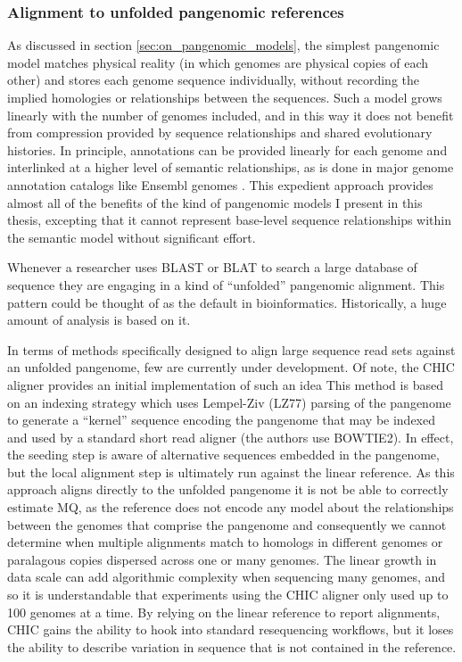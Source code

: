 \subsubsection{Alignment to unfolded pangenomic references}

As discussed in section \ref{sec:on_pangenomic_models}, the simplest pangenomic model matches physical reality (in which genomes are physical copies of each other) and stores each genome sequence individually, without recording the implied homologies or relationships between the sequences.
Such a model grows linearly with the number of genomes included, and in this way it does not benefit from compression provided by sequence relationships and shared evolutionary histories.
In principle, annotations can be provided linearly for each genome and interlinked at a higher level of semantic relationships, as is done in major genome annotation catalogs like Ensembl genomes \cite{kersey2015ensembl}.
This expedient approach provides almost all of the benefits of the kind of pangenomic models I present in this thesis, excepting that it cannot represent base-level sequence relationships within the semantic model without significant effort.

Whenever a researcher uses BLAST or BLAT to search a large database of sequence they are engaging in a kind of ``unfolded'' pangenomic alignment.
This pattern could be thought of as the default in bioinformatics.
Historically, a huge amount of analysis is based on it.

In terms of methods specifically designed to align large sequence read sets against an unfolded pangenome, few are currently under development.
Of note, the CHIC aligner provides an initial implementation of such an idea \cite{valenzuela2017chic}
This method is based on an indexing strategy which uses Lempel-Ziv (LZ77) \cite{ziv1977universal} parsing of the pangenome to generate a ``kernel'' sequence encoding the pangenome that may be indexed and used by a standard short read aligner (the authors use BOWTIE2).
In effect, the seeding step is aware of alternative sequences embedded in the pangenome, but the local alignment step is ultimately run against the linear reference.
As this approach aligns directly to the unfolded pangenome it is not be able to correctly estimate MQ, as the reference does not encode any model about the relationships between the genomes that comprise the pangenome and consequently we cannot determine when multiple alignments match to homologs in different genomes or paralagous copies dispersed across one or many genomes.
The linear growth in data scale can add algorithmic complexity when sequencing many genomes, and so it is understandable that experiments using the CHIC aligner only used up to 100 genomes at a time.
By relying on the linear reference to report alignments, CHIC gains the ability to hook into standard resequencing workflows, but it loses the ability to describe variation in sequence that is not contained in the reference.

